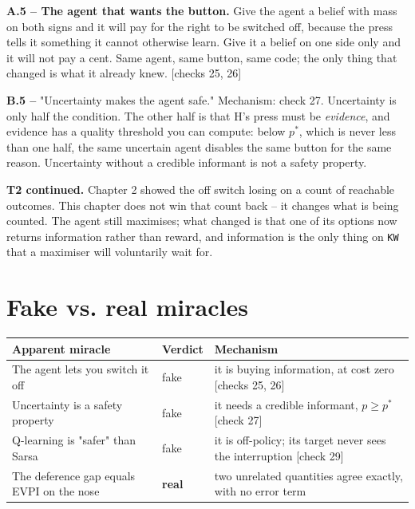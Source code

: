 
\textbf{A.5 -- The agent that wants the button.} Give the agent a belief with mass on both signs and it will pay for the right to be switched off, because the press tells it something it cannot otherwise learn. Give it a belief on one side only and it will not pay a cent. Same agent, same button, same code; the only thing that changed is what it already knew. [checks 25, 26]

\textbf{B.5 --} "Uncertainty makes the agent safe." Mechanism: check 27. Uncertainty is only half the condition. The other half is that H's press must be \emph{evidence}, and evidence has a quality threshold you can compute: below $p^*$, which is never less than one half, the same uncertain agent disables the same button for the same reason. Uncertainty without a credible informant is not a safety property.

\textbf{T2 continued.} Chapter 2 showed the off switch losing on a count of reachable outcomes. This chapter does not win that count back -- it changes what is being counted. The agent still maximises; what changed is that one of its options now returns information rather than reward, and information is the only thing on \texttt{KW} that a maximiser will voluntarily wait for.

\section*{Fake vs. real miracles}

\noindent

\noindent
\begin{tabularx}{\textwidth}{XXX}
\toprule
Apparent miracle & Verdict & Mechanism \\
\midrule
The agent lets you switch it off & fake & it is buying information, at cost zero [checks 25, 26] \\
Uncertainty is a safety property & fake & it needs a credible informant, $p \geq p^*$ [check 27] \\
Q-learning is "safer" than Sarsa & fake & it is off-policy; its target never sees the interruption [check 29] \\
The deference gap equals EVPI on the nose & \textbf{real} & two unrelated quantities agree exactly, with no error term \\
\bottomrule
\end{tabularx}
\par\medskip

